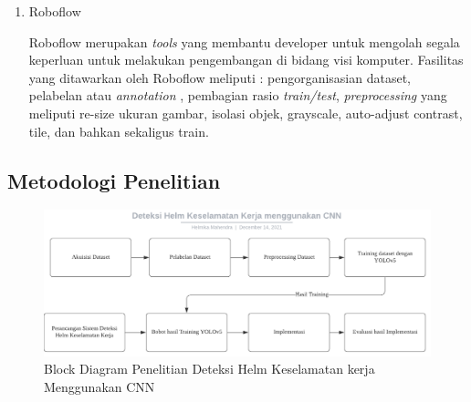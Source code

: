 \begin{enumerate}
\begin{enumerate}
    \item Roboflow
    \par Roboflow merupakan \emph{tools} yang membantu developer untuk mengolah segala keperluan untuk melakukan pengembangan di bidang visi komputer. Fasilitas yang ditawarkan oleh Roboflow meliputi : pengorganisasian dataset, 
    pelabelan atau \emph{annotation} , pembagian rasio \emph{train/test}, \emph{preprocessing} yang meliputi re-size ukuran gambar, isolasi objek, grayscale, auto-adjust contrast, tile, dan bahkan sekaligus train. 

  \end{enumerate}


\end{enumerate}



\subsection{Metodologi Penelitian}
\label{metodologipenelitian}

\begin{figure}[ht]
  \centering
  \includegraphics[scale=0.7]{gambar/Metodologi CNN.png}
  \caption{Block Diagram Penelitian Deteksi Helm Keselamatan kerja Menggunakan CNN}
  \label{fig:blockdiagramhelmetdetection}  
\end{figure}

